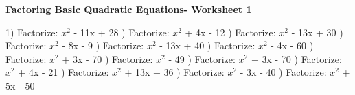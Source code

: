 \documentclass{article}%
\begin{document}
\large%
\begin{center}%
\textbf{Factoring Basic Quadratic Equations- Worksheet 1}%
\newline%
\newline%
\newline%
\end{center} \normalsize%
1) Factorize: $x^2$ - 11x + 28%
\newline%
\newline%
) Factorize: $x^2$ + 4x - 12%
\newline%
\newline%
) Factorize: $x^2$ - 13x + 30%
\newline%
\newline%
) Factorize: $x^2$ - 8x - 9%
\newline%
\newline%
) Factorize: $x^2$ - 13x + 40%
\newline%
\newline%
) Factorize: $x^2$ - 4x - 60%
\newline%
\newline%
) Factorize: $x^2$ + 3x - 70%
\newline%
\newline%
) Factorize: $x^2$ - 49%
\newline%
\newline%
) Factorize: $x^2$ + 3x - 70%
\newline%
\newline%
) Factorize: $x^2$ + 4x - 21%
\newline%
\newline%
) Factorize: $x^2$ + 13x + 36%
\newline%
\newline%
) Factorize: $x^2$ - 3x - 40%
\newline%
\newline%
) Factorize: $x^2$ + 5x - 50%
\newline%
\newline%
\end{document}
